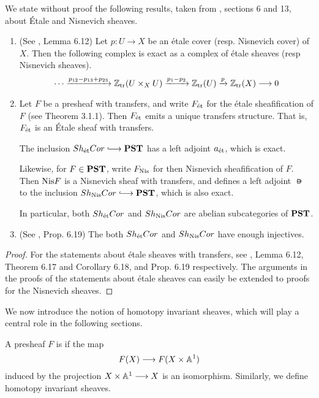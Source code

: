 We state without proof the following results, taken from 
\cite{MVW}, sections 6 and 13, about \'Etale and Nisnevich 
sheaves. 

\begin{prop}
\begin{enumerate}
\item (See \cite{MVW}, Lemma 6.12) Let $p : U \to X$ be an \'etale 
cover (resp. Nisnevich cover) of $X$. Then the following complex 
is exact as a complex of \'etale sheaves (resp Nisnevich sheaves).
\[
\cdots \xrightarrow{p_{12} - p_{13} + p_{23}} \mathbb{Z}_{\mathrm{tr}}(U \times_X U)
   \xrightarrow{p_1 - p_2} \mathbb{Z}_{\mathrm{tr}}(U) \xrightarrow{p} \mathbb{Z}_{\mathrm{tr}}(X) \longrightarrow 0
\]

\item Let $F$ be a presheaf with transfers, and write $F_{\mathrm{\acute{e}t}}$
for the \'etale sheafification of $F$ (see \cite{Tamme} Theorem 
3.1.1). Then $F_{\mathrm{\acute{e}t}}$ emits a unique transfers structure. That 
is, $F_{\mathrm{\acute{e}t}}$ is an \'Etale sheaf with transfers.

The inclusion $\ShEtCor \into \PST$ has a left adjoint $a_{\mathrm{\acute{e}t}}$, 
which is exact. 

Likewise, for $F \in \mathbf{PST}$, write $F_{\mathrm{Nis}}$ for then Nisnevich
sheafification of $F$. Then $\mathrm{Nis}{F}$ is a Nisnevich sheaf with
transfers, and defines a left adjoint $\nis$ to the inclusion $\ShNisCor
\into \PST$, which is also exact. 

In particular, both $Sh_{\mathrm{\acute{e}t}}Cor$ and $Sh_{\mathrm{Nis}}Cor$ are abelian 
subcategories of $\mathbf{PST}$.

\item (See \cite{MVW}, Prop. 6.19) The both $Sh_{\mathrm{\acute{e}t}}Cor$ and $Sh_{\mathrm{Nis}}Cor$
have enough injectives.
\end{enumerate}
\end{prop}
\begin{proof}
For the statements about \'etale sheaves with transfers, see 
\cite{MVW}, Lemma 6.12, Theorem 6.17 and Corollary 6.18, and 
Prop. 6.19 respectively. The arguments in the proofs of the
statements about \'etale sheaves can easily be extended to proofs
for the Nisnevich sheaves.
\end{proof}

We now introduce the notion of homotopy invariant sheaves, which
will play a central role in the following sections.

\begin{defn}
A presheaf $F$ is  if the map 
\[
F(X) \longrightarrow F(X \times \mathbb{A}^1)
\]
induced by the projection $X \times \mathbb{A}^1 \longrightarrow X$ is an isomorphism.
Similarly, we define homotopy invariant sheaves.
\end{defn}

